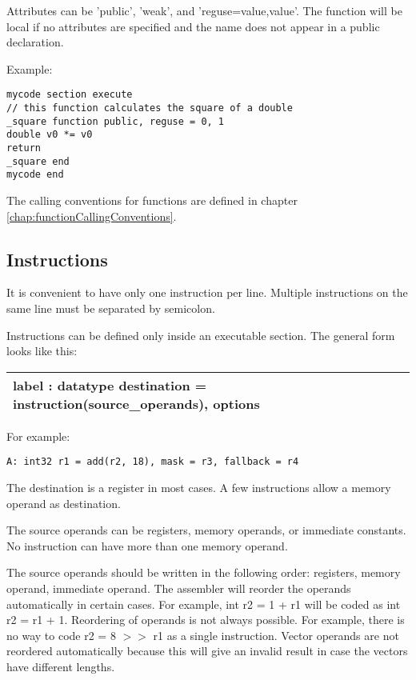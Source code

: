 \documentclass[forwardcom.tex]{subfiles}
\begin{document}
Attributes can be 'public', 'weak', and 'reguse=value,value'. 
The function will be local if no attributes are specified and 
the name does not appear in a public declaration.
\vv

Example:
\vspace{1mm}

\begin{lstlisting}[frame=single]
mycode section execute
// this function calculates the square of a double
_square function public, reguse = 0, 1
double v0 *= v0
return
_square end
mycode end
\end{lstlisting}
\vv

The calling conventions for functions are defined in chapter \ref{chap:functionCallingConventions}.
\vv


\subsection{Instructions} \label{assemblyInstructions}
It is convenient to have only one instruction per line. Multiple instructions on the same line must be separated by semicolon.
\vv

Instructions can be defined only inside an executable section. The general form looks like this:

\begin{tabular}{|p{130mm}|}
\hline
\hspace{4mm} label : datatype destination = instruction(source\_operands), options \\
\hline
\end{tabular}
\vspace{4mm}

For example:
\begin{lstlisting}[frame=single]
A: int32 r1 = add(r2, 18), mask = r3, fallback = r4
\end{lstlisting}
\vv

The destination is a register in most cases. A few instructions allow a memory operand as destination.
\vv

The source operands can be registers, memory operands, or immediate constants. 
No instruction can have more than one memory operand.
\vv

The source operands should be written in the following order: registers, memory operand, immediate operand. The assembler will reorder the operands automatically in certain cases. For example, int r2 = 1 + r1 will be coded as int r2 = r1 + 1. Reordering of operands is not always possible. For example, there is no way to code r2 = 8 $>>$ r1 as a single instruction. Vector operands are not reordered automatically because this will give an invalid result in case the vectors have different lengths.
\vspace{4mm}
\end{document}
